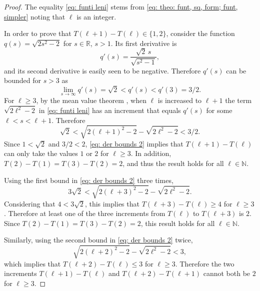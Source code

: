 \documentclass[12pt, a4paper]{article}
\newcommand{\funti}{T} %
\newcommand{\len}{\ell} %
\newcommand{\leni}{\ell} %
\newcommand{\genfun}{q}
\newcommand{\genvar}{s}
\begin{document}
\begin{proof}
The equality \eqref{eq: funti leni} stems from \eqref{eq: theo: funt, sq, form; funt, simpler} noting that $\len$ is an integer.

In order to prove that $\funti(\leni+1)-\funti(\leni) \in \{1,2\}$, consider the function $\genfun(\genvar) = \sqrt{2\genvar^2-2}$ for $\genvar \in \mathbb R$, $\genvar>1$. Its first derivative is
\begin{equation}
\genfun'(\genvar) = \frac {\sqrt{2} \, \genvar} {\sqrt{\genvar^2-1}},
\end{equation}
and its second derivative is easily seen to be negative. Therefore $\genfun'(\genvar)$ can be bounded for $\genvar > 3$ as
\begin{equation}
\label{eq: der bounds}
\lim_{\genvar \rightarrow \infty} \genfun'(\genvar) = \sqrt{2} < \genfun'(\genvar) < \genfun'(3) = 3/2.
\end{equation}
For $\leni \geq 3$,
by the mean value theorem \cite[section~5.3]{Abbott15}, when $\leni$ is increased to $\leni+1$ the term $\sqrt{2\leni^2-2}$ in \eqref{eq: funti leni} has an increment that equals $\genfun'(\genvar)$ for some $\leni < \genvar < \leni+1$. Therefore
\begin{equation}
\label{eq: der bounds 2}
\sqrt{2} < \sqrt{2(\leni+1)^2-2} - \sqrt{2\leni^2-2} < 3/2.
\end{equation}
Since $1 < \sqrt{2}$ and $3/2 < 2$, \eqref{eq: der bounds 2} implies that $\funti(\leni+1)-\funti(\leni)$ can only take the values $1$ or $2$ for $\leni \geq 3$. In addition, $\funti(2)-\funti(1) = \funti(3)-\funti(2) = 2$, and thus the result holds for all $\leni \in \mathbb N$.

Using the first bound in \eqref{eq: der bounds 2} three times,
\begin{equation}
3\sqrt{2} < \sqrt{2(\leni+3)^2-2} - \sqrt{2\leni^2-2}.
\end{equation}
Considering that $4 < 3\sqrt{2}$, this implies that $\funti(\leni+3)-\funti(\leni) \geq 4$ for $\leni \geq 3$. Therefore at least one of the three increments from $\funti(\leni)$ to $\funti(\leni+3)$ is $2$. Since $\funti(2)-\funti(1) = \funti(3)-\funti(2) = 2$, this result holds for all $\leni \in \mathbb N$.

Similarly, using the second bound in \eqref{eq: der bounds 2} twice,
\begin{equation}
\sqrt{2(\leni+2)^2-2} - \sqrt{2\leni^2-2} < 3,
\end{equation}
which implies that $\funti(\leni+2)-\funti(\leni) \leq 3$ for $\leni \geq 3$. Therefore the two increments $\funti(\leni+1)-\funti(\leni)$ and $\funti(\leni+2)-\funti(\leni+1)$ cannot both be $2$ for $\leni \geq 3$.
\end{proof}
\end{document}
